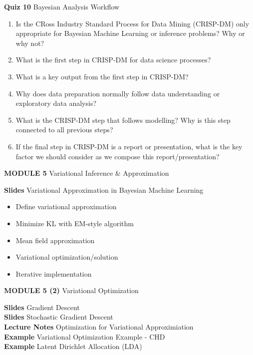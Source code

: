 \documentclass{article}
\begin{document}
\noindent \textbf{Quiz 10} Bayesian Analysis Workflow
\begin{enumerate}
    \item Is the CRoss Industry Standard Process for Data Mining (CRISP-DM) only appropriate for Bayesian Machine Learning or inference problems? Why or why not?
    \item What is the first step in CRISP-DM for data science processes?
    \item What is a key output from the first step in CRISP-DM?
    \item Why does data preparation normally follow data understanding or exploratory data analysis?
    \item What is the CRISP-DM step that follows modelling? Why is this step connected to all previous steps?
    \item If the final step in CRISP-DM is a report or presentation, what is the key factor we should consider as we compose this report/presentation?
\end{enumerate}

\newpage
\noindent \textbf{MODULE 5} Variational Inference \& Approximation

\noindent \textbf{Slides} Variational Approximation in Bayesian Machine Learning
\begin{itemize}
    \item Define variational approximation
    \item Minimize KL with EM-style algorithm
    \item Mean field approximation
    \item Variational optimization/solution
    \item Iterative implementation
\end{itemize}


\newpage
\noindent \textbf{MODULE 5 (2)} Variational Optimization

\noindent \textbf{Slides} Gradient Descent \\

\noindent \textbf{Slides} Stochastic Gradient Descent \\

\noindent \textbf{Lecture Notes} Optimization for Variational Approximiation \\

\noindent \textbf{Example} Variational Optimization Example - CHD \\

\noindent \textbf{Example} Latent Dirichlet Allocation (LDA) \\
\end{document}
